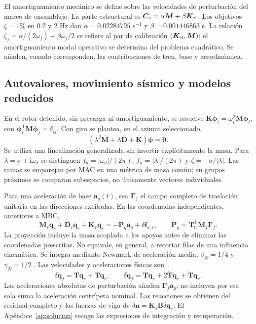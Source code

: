 \documentclass[oneside,a4paper,spanish,links,pagenumbers]{amca}
\newcommand{\tr}{\mathsf T}
\begin{document}
El amortiguamiento mecánico se define sobre las velocidades de perturbación del marco de ensamblaje. La parte estructural es $\bm C_s=\alpha\bm M+\beta\bm K_{\rm el}$. Los objetivos $\zeta=1\%$ en 0.2 y 2 Hz dan $\alpha=0.02284795$ s$^{-1}$ y $\beta=0.001446863$ s. La relación $\zeta_j=\alpha/(2\omega_j)+\beta\omega_j/2$ se refiere al par de calibración $(\bm K_{\rm el},\bm M)$; el amortiguamiento modal operativo se determina del problema cuadrático. Se añaden, cuando corresponden, las contribuciones de tren, base y aerodinámica.

\subsection{Autovalores, movimiento sísmico y modelos reducidos}
\label{sec:modalrom}
En el rotor detenido, sin precarga ni amortiguamiento, se resuelve $\bm K\bm\phi_i=\omega_i^2\bm M\bm\phi_i$, con $\bm\phi_i^\tr\bm M\bm\phi_j=\delta_{ij}$. Con giro se plantea, en el azimut seleccionado,
\begin{equation}
 (\lambda^2\overline{\bm M}+\lambda\overline{\bm D}+\overline{\bm K})\bm\phi=\bm0.
 \label{eq:qep}
\end{equation}
Se utiliza una linealización generalizada sin invertir explícitamente la masa. Para $\lambda=\sigma+\mathrm i\omega_d$ se distinguen $f_d=|\omega_d|/(2\pi)$, $f_n=|\lambda|/(2\pi)$ y $\zeta=-\sigma/|\lambda|$. Las ramas se emparejan por MAC en una métrica de masa común; en grupos próximos se comparan subespacios, no únicamente vectores individuales.

Para una aceleración de base $\bm a_g(t)$, sea $\bm\Gamma_f$ el campo completo de traslación unitaria en las direcciones excitadas. En las coordenadas independientes, anteriores a MBC,
\begin{equation}
 \bm M_r\ddot{\bm q}_r+\bm D_r\dot{\bm q}_r+\bm K_r\bm q_r
 =-\bm P_g\bm a_g+\delta\bm f_{a,r},\qquad
 \bm P_g=\bm T_0^\tr\bm M_I\bm\Gamma_f.
 \label{eq:sismo}
\end{equation}
La proyección incluye la masa acoplada a los apoyos antes de eliminar las coordenadas prescritas. No equivale, en general, a recortar filas de una influencia cinemática. Se integra mediante Newmark de aceleración media, $\beta_N=1/4$ y $\gamma_N=1/2$ \citep{newmark1971}. Las velocidades y aceleraciones físicas son
\begin{equation}
 \delta\dot{\bm q}_f=\bm T\dot{\bm q}_r+\dot{\bm T}\bm q_r,\qquad
 \delta\ddot{\bm q}_f=\bm T\ddot{\bm q}_r+2\dot{\bm T}\dot{\bm q}_r+\ddot{\bm T}\bm q_r.
 \label{eq:recuperacion}
\end{equation}
Las aceleraciones absolutas de perturbación añaden $\bm\Gamma_f\bm a_g$; no incluyen por esa sola suma la aceleración centrípeta nominal. Las reacciones se obtienen del residual completo y las fuerzas de viga de $\delta\bm n=\bm K_s\bm B\delta\bm q_e$. El Apéndice~\ref{ap:solucion} recoge las expresiones de integración y recuperación.
\end{document}
